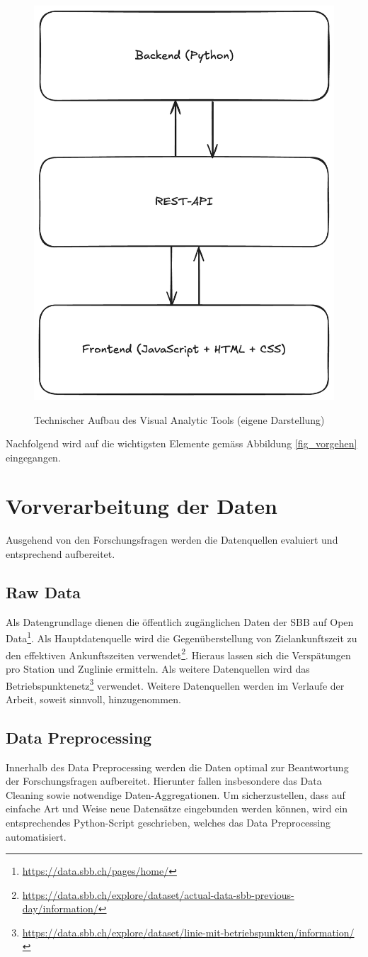 \begin{figure}[H]
    \caption{Technischer Aufbau des Visual Analytic Tools (eigene Darstellung)}
    \includegraphics[width=.3\linewidth]{content/00_assets/aufbau_va_tool.png}
    \label{fig_va_tool_design}
\end{figure}

Nachfolgend wird auf die wichtigsten Elemente gemäss Abbildung \ref{fig_vorgehen} eingegangen.

\section{Vorverarbeitung der Daten}
Ausgehend von den Forschungsfragen werden die Datenquellen evaluiert und entsprechend aufbereitet.

\subsection{Raw Data}
Als Datengrundlage dienen die öffentlich zugänglichen Daten der SBB auf Open Data\footnote{\url{https://data.sbb.ch/pages/home/}}. Als Hauptdatenquelle wird die Gegenüberstellung von Zielankunftszeit zu den effektiven Ankunftszeiten verwendet\footnote{\url{https://data.sbb.ch/explore/dataset/actual-data-sbb-previous-day/information/}}. Hieraus lassen sich die Verspätungen pro Station und Zuglinie ermitteln. Als weitere Datenquellen wird das Betriebspunktenetz\footnote{\url{https://data.sbb.ch/explore/dataset/linie-mit-betriebspunkten/information/}} verwendet. Weitere Datenquellen werden im Verlaufe der Arbeit, soweit sinnvoll, hinzugenommen.

\subsection{Data Preprocessing}
Innerhalb des Data Preprocessing werden die Daten optimal zur Beantwortung der Forschungsfragen aufbereitet. Hierunter fallen insbesondere das Data Cleaning sowie notwendige Daten-Aggregationen. Um sicherzustellen, dass auf einfache Art und Weise neue Datensätze eingebunden werden können, wird ein entsprechendes Python-Script geschrieben, welches das Data Preprocessing automatisiert.

